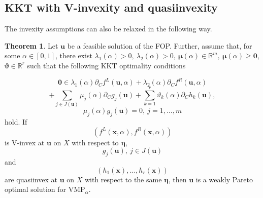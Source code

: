 \documentclass{article}
\theoremstyle{definition}
\newtheorem{theorem}[maar]{Theorem}
\begin{document}
\subsection{KKT with V-invexity and quasiinvexity}
The invexity assumptions can also be relaxed in the following way.

\begin{theorem}\label{Vinvquas} Let $\boldsymbol u$ be a feasible solution of the FOP. Further, assume that, for some $ \alpha \in [0,1]$, there exist $ \lambda_1( \alpha) > 0,\  \lambda_2( \alpha) > 0,\  {\boldsymbol \mu}( \alpha) \in \mathbb R^{m},\  {\boldsymbol \mu}( \alpha) \geq {\boldsymbol 0}$, $ {\boldsymbol \vartheta} \in \mathbb R^r$ such that the following KKT optimality conditions

$$\boldsymbol 0 \in  \lambda_1( \alpha)\partial_C f^L(\boldsymbol u,  \alpha) +  \lambda_2( \alpha)\partial_C f^R(\boldsymbol u,  \alpha)$$
$$+ \sum_{j \in J(\boldsymbol{u})}  \mu_j( \alpha)\partial_C g_j(\boldsymbol u) + \sum_{k=1}^r  \vartheta_k( \alpha)\partial _Ch_k(\boldsymbol u),$$
$$ \mu_j( \alpha)g_j(\boldsymbol u) = 0,\ j=1,\dots,m$$
hold. 
If $$(f^L(\boldsymbol x,  \alpha), f^R(\boldsymbol x,  \alpha))$$ is V-invex at $\boldsymbol u$ on $X$ with respect to $\boldsymbol \eta$, $$g_j(\boldsymbol{u}),\ j \in J(\boldsymbol{u})$$ and $$(h_1(\boldsymbol x),\dots,h_r(\boldsymbol x))$$ are quasiinvex at $\boldsymbol u$ on $X$ with respect to the same $\boldsymbol \eta$, then $\boldsymbol u$ is a weakly Pareto optimal solution for VMP$_\alpha$.
\end{theorem}
\end{document}
